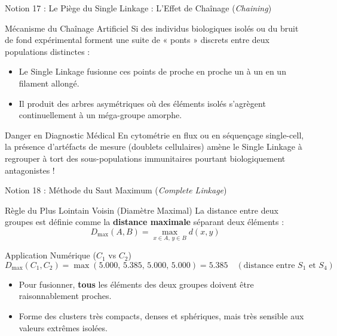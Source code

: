 \documentclass[aspectratio=169,10pt]{beamer}
\begin{document}
\begin{frame}{Notion 17 : Le Piège du Single Linkage : L'Effet de Chaînage (\textit{Chaining})}
  \begin{conceptbox}{Mécanisme du Chaînage Artificiel}
    \footnotesize
    Si des individus biologiques isolés ou du bruit de fond expérimental forment une suite de « ponts » discrets entre deux populations distinctes :
    \begin{itemize}
      \item Le Single Linkage fusionne ces points de proche en proche un à un en un filament allongé.
      \item Il produit des arbres asymétriques où des éléments isolés s'agrègent continuellement à un méga-groupe amorphe.
    \end{itemize}
  \end{conceptbox}
  \vspace{1mm}
  \begin{warnbox}{Danger en Diagnostic Médical}
    \footnotesize
    En cytométrie en flux ou en séquençage single-cell, la présence d'artéfacts de mesure (doublets cellulaires) amène le Single Linkage à regrouper à tort des sous-populations immunitaires pourtant biologiquement antagonistes !
  \end{warnbox}
\end{frame}

\begin{frame}{Notion 18 : Méthode du Saut Maximum (\textit{Complete Linkage})}
  \begin{conceptbox}{Règle du Plus Lointain Voisin (Diamètre Maximal)}
    \footnotesize
    La distance entre deux groupes est définie comme la \textbf{distance maximale} séparant deux éléments :
    \begin{equation*}
      D_{\max}(A, B) = \max_{x \in A, \, y \in B} d(x, y)
    \end{equation*}
  \end{conceptbox}
  \vspace{1mm}
  \begin{biobox}{Application Numérique ($C_1$ vs $C_2$)}
    \footnotesize
    \begin{equation*}
      D_{\max}(C_1, C_2) = \max(5.000, \, 5.385, \, 5.000, \, 5.000) = \mathbf{5.385} \quad (\text{distance entre } S_1 \text{ et } S_4)
    \end{equation*}
    \begin{itemize}
      \item Pour fusionner, \textbf{tous} les éléments des deux groupes doivent être raisonnablement proches.
      \item Forme des clusters très compacts, denses et sphériques, mais très sensible aux valeurs extrêmes isolées.
    \end{itemize}
  \end{biobox}
\end{frame}
\end{document}
